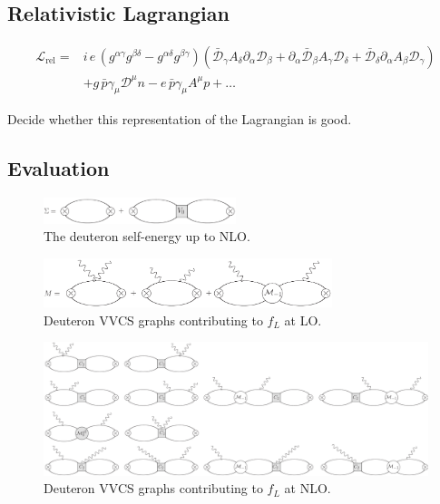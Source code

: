 \documentclass[prl,
twocolumn,
showpacs,preprintnumbers,amsmath,amssymb,
superscriptaddress,
a4paper,nofootinbib,longbibliography]{revtex4-2}
\begin{document}
\section{}

\subsection{Relativistic Lagrangian}
\begin{align}
\mathcal{L}_\text{rel}=&
i\,e\,(g^{\alpha\gamma}g^{\beta\delta}-g^{\alpha\delta}g^{\beta\gamma})
\left(\bar{\mathcal{D}}_\gamma A_\delta\partial_\alpha\mathcal{D}_\beta
+\partial_\alpha\bar{\mathcal{D}}_\beta A_\gamma\mathcal{D}_\delta
+\bar{\mathcal{D}}_\delta \partial_\alpha A_\beta\mathcal{D}_\gamma\right)\nonumber\\
&+g\,\bar{p}\gamma_\mu\mathcal{D}^\mu n
-e\,\bar{p}\gamma_\mu A^\mu p
+\dots
\end{align}

{\color{red} Decide whether this representation of the Lagrangian is good.}


\subsection{Evaluation}

\begin{figure}[ht]
\includegraphics[width=0.5\textwidth]{figs/LO_NLO_Self_Energy.pdf}
\caption{The deuteron self-energy up to NLO.}
\end{figure}

\begin{figure}[ht]
\includegraphics[width=0.75\textwidth]{figs/LO_VVCS_Diagrams.pdf}
\caption{Deuteron VVCS graphs contributing to $f_L$ at LO.}
\end{figure}

\begin{figure}[htb]
\includegraphics[width=\textwidth]{figs/NLO_VVCS_Diagrams.pdf}
\caption{Deuteron VVCS graphs contributing to $f_L$ at NLO.}
\end{figure}
\end{document}
